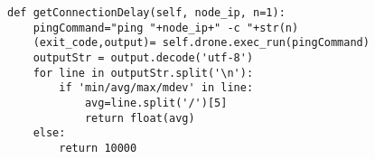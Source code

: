 \begin{lstlisting}[caption={Késleltetés megállapítása a konténer és a node között}, label={lst:ping}]
def getConnectionDelay(self, node_ip, n=1):
	pingCommand="ping "+node_ip+" -c "+str(n)
	(exit_code,output)= self.drone.exec_run(pingCommand)
	outputStr = output.decode('utf-8')
	for line in outputStr.split('\n'):
		if 'min/avg/max/mdev' in line:
			avg=line.split('/')[5]
			return float(avg)
	else:
		return 10000
\end{lstlisting}





